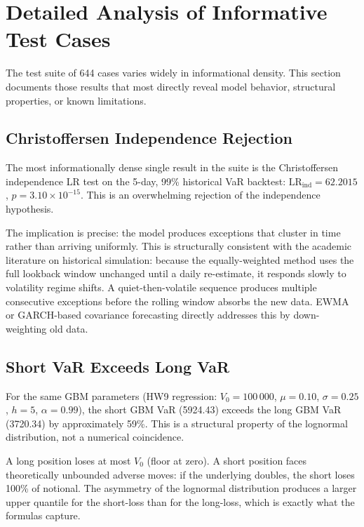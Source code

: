 \documentclass[11pt]{article}
\begin{document}
\section{Detailed Analysis of Informative Test Cases}

The test suite of 644 cases varies widely in informational density.
This section documents those results that most directly reveal model
behavior, structural properties, or known limitations.

\subsection{Christoffersen Independence Rejection}

The most informationally dense single result in the suite is the
Christoffersen independence LR test on the 5-day, 99\% historical VaR
backtest: $\mathrm{LR}_{\mathrm{ind}} = 62.2015$, $p = 3.10 \times
10^{-15}$.  This is an overwhelming rejection of the independence
hypothesis.

The implication is precise: the model produces exceptions that cluster
in time rather than arriving uniformly.  This is structurally consistent
with the academic literature on historical simulation: because the
equally-weighted method uses the full lookback window unchanged until a
daily re-estimate, it responds slowly to volatility regime shifts.  A
quiet-then-volatile sequence produces multiple consecutive exceptions
before the rolling window absorbs the new data.  EWMA or GARCH-based
covariance forecasting directly addresses this by down-weighting old data.

\subsection{Short VaR Exceeds Long VaR}

For the same GBM parameters (HW9 regression: $V_0 = 100\,000$,
$\mu = 0.10$, $\sigma = 0.25$, $h = 5$, $\alpha = 0.99$), the short GBM VaR
(5924.43) exceeds the long GBM VaR (3720.34) by approximately 59\%.  This
is a structural property of the lognormal distribution, not a numerical
coincidence.

A long position loses at most $V_0$ (floor at zero).  A short position faces
theoretically unbounded adverse moves: if the underlying doubles, the short
loses 100\% of notional.  The asymmetry of the lognormal distribution
produces a larger upper quantile for the short-loss than for the long-loss,
which is exactly what the formulas capture.
\end{document}
